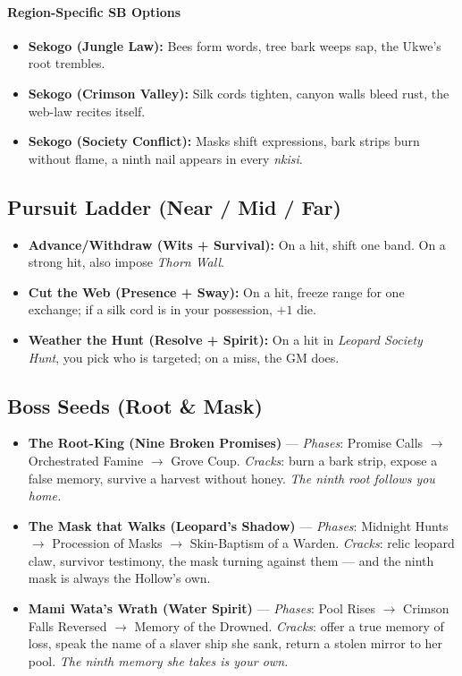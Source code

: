 \paragraph{Region-Specific SB Options}
\begin{itemize}
\item \textbf{Sekogo (Jungle Law):} Bees form words, tree bark weeps sap, the Ukwe's root trembles.
\item \textbf{Sekogo (Crimson Valley):} Silk cords tighten, canyon walls bleed rust, the web-law recites itself.
\item \textbf{Sekogo (Society Conflict):} Masks shift expressions, bark strips burn without flame, a ninth nail appears in every \textit{nkisi}.
\end{itemize}

\subsection*{Pursuit Ladder (Near / Mid / Far)}
\begin{itemize}
\item \textbf{Advance/Withdraw (Wits + Survival):} On a hit, shift one band. On a strong hit, also impose \emph{Thorn Wall}.
\item \textbf{Cut the Web (Presence + Sway):} On a hit, freeze range for one exchange; if a silk cord is in your possession, $+1$ die.
\item \textbf{Weather the Hunt (Resolve + Spirit):} On a hit in \emph{Leopard Society Hunt}, you pick who is targeted; on a miss, the GM does.
\end{itemize}

\subsection*{Boss Seeds (Root \& Mask)}
\begin{itemize}
\item \textbf{The Root-King (Nine Broken Promises)} --- \emph{Phases}: Promise Calls $\rightarrow$ Orchestrated Famine $\rightarrow$ Grove Coup. \emph{Cracks}: burn a bark strip, expose a false memory, survive a harvest without honey. \textit{The ninth root follows you home.}
\item \textbf{The Mask that Walks (Leopard's Shadow)} --- \emph{Phases}: Midnight Hunts $\rightarrow$ Procession of Masks $\rightarrow$ Skin-Baptism of a Warden. \emph{Cracks}: relic leopard claw, survivor testimony, the mask turning against them --- and the ninth mask is always the Hollow's own. 
\item \textbf{Mami Wata's Wrath (Water Spirit)} --- \emph{Phases}: Pool Rises $\rightarrow$ Crimson Falls Reversed $\rightarrow$ Memory of the Drowned. \emph{Cracks}: offer a true memory of loss, speak the name of a slaver ship she sank, return a stolen mirror to her pool. \textit{The ninth memory she takes is your own.}
\end{itemize}

